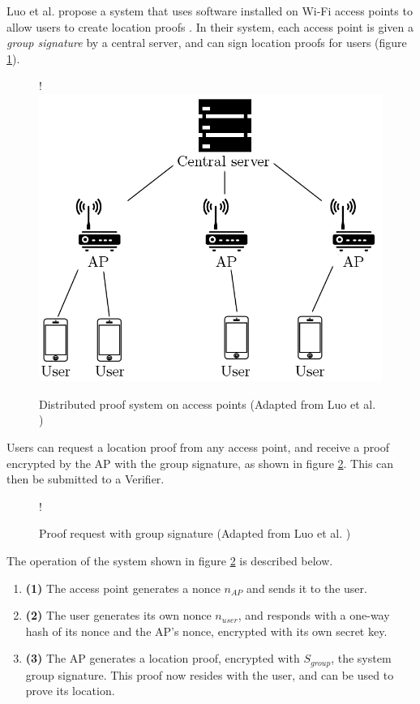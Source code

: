 Luo et al. propose a system that uses software installed on Wi-Fi access points to allow users to create location proofs \cite{luo}. In their system, each access point is given a \textit{group signature} by a central server, and can sign location proofs for users (figure \ref{fig:luo_diagram}).

\begin{figure}[H]
\begin{center}
 {!} {\includegraphics{diagrams/ap_paper.png}}
\caption{Distributed proof system on access points (Adapted from Luo et al. \cite{luo})}
\label{fig:luo_diagram}
\end{center}
\end{figure}

Users can request a location proof from any access point, and receive a proof encrypted by the AP with the group signature, as shown in figure \ref{fig:luo_transaction}. This can then be submitted to a Verifier.

\begin{figure}[H]
\begin{center}
 {!} {}
\caption{Proof request with group signature (Adapted from Luo et al. \cite{luo})}
\label{fig:luo_transaction}
\end{center}
\end{figure}

The operation of the system shown in figure \ref{fig:luo_transaction} is described below.
\begin{enumerate}
\item[] \textbf{(1)} The access point generates a nonce $n_{AP}$ and sends it to the user.
\item[] \textbf{(2)} The user generates its own nonce $n_{user}$, and responds with a one-way hash of its nonce and the AP's nonce, encrypted with its own secret key.
\item[] \textbf{(3)} The AP generates a location proof, encrypted with $S_{group}$, the system group signature. This proof now resides with the user, and can be used to prove its location.
\end{enumerate}

